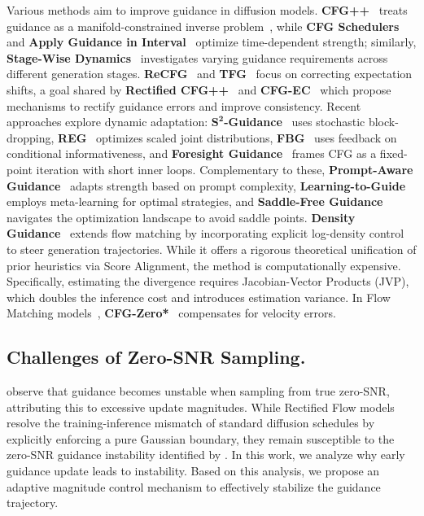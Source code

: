 Various methods aim to improve guidance in diffusion models. \textbf{CFG++}~\citep{chungcfg++} treats guidance as a manifold-constrained inverse problem~\citep{karczewski2025spacetime}, while \textbf{CFG Schedulers}~\citep{xianalysis} and \textbf{Apply Guidance in Interval}~\citep{kynkaanniemi2024applying} optimize time-dependent strength; similarly, \textbf{Stage-Wise Dynamics}~\citep{jin2025stage} investigates varying guidance requirements across different generation stages. \textbf{ReCFG}~\citep{xia2025rectified} and \textbf{TFG}~\citep{ye2024tfg} focus on correcting expectation shifts, a goal shared by \textbf{Rectified CFG++}~\citep{saini2025rectified} and \textbf{CFG-EC}~\citep{yang2025cfg} which propose mechanisms to rectify guidance errors and improve consistency. Recent approaches explore dynamic adaptation: $\mathbf{S^2}$\textbf{-Guidance}~\citep{chen2025s} uses stochastic block-dropping, \textbf{REG}~\citep{gao2025reg} optimizes scaled joint distributions, \textbf{FBG}~\citep{koulischer2025feedback} uses feedback on conditional informativeness, and \textbf{Foresight Guidance}~\citep{wang2025foresight} frames CFG as a fixed-point iteration with short inner loops. Complementary to these, \textbf{Prompt-Aware Guidance}~\citep{zhang2025prompt} adapts strength based on prompt complexity, \textbf{Learning-to-Guide}~\citep{galashov2025learn} employs meta-learning for optimal strategies, and \textbf{Saddle-Free Guidance}~\citep{yeats2025saddle} navigates the optimization landscape to avoid saddle points.
\textbf{Density Guidance}~\citep{zhao2025devil} extends flow matching by incorporating explicit log-density control to steer generation trajectories. While it offers a rigorous theoretical unification of prior heuristics via Score Alignment, the method is computationally expensive. Specifically, estimating the divergence requires Jacobian-Vector Products (JVP), which doubles the inference cost and introduces estimation variance.
In Flow Matching models~\citep{esser2024scalingrectifiedflowtransformers, lipman2022flow, fan2025vchitect, liu2022flow, gao2024lumina}, \textbf{CFG-Zero*}~\citep{fan2025cfg0} compensates for velocity errors.

\subsection{Challenges of Zero-SNR Sampling.} 
\citet{lin2024common} observe that guidance becomes unstable when sampling from true zero-SNR, attributing this to excessive update magnitudes. While Rectified Flow models~\citep{liu2022flow} resolve the training-inference mismatch of standard diffusion schedules by explicitly enforcing a pure Gaussian boundary, they remain susceptible to the zero-SNR guidance instability identified by \citet{lin2024common}. In this work, we analyze why early guidance update leads to instability. Based on this analysis, we propose an adaptive magnitude control mechanism to effectively stabilize the guidance trajectory.

